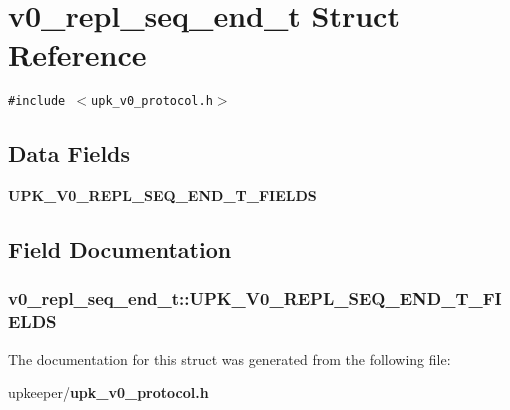 \section{v0\_\-repl\_\-seq\_\-end\_\-t Struct Reference}
\label{structv0__repl__seq__end__t}
{\tt \#include $<$upk\_\-v0\_\-protocol.h$>$}

\subsection*{Data Fields}
\begin{CompactItemize}
\item 
\bf{UPK\_\-V0\_\-REPL\_\-SEQ\_\-END\_\-T\_\-FIELDS}
\end{CompactItemize}


\subsection{Field Documentation}
\subsubsection{\setlength{\rightskip}{0pt plus 5cm}\bf{v0\_\-repl\_\-seq\_\-end\_\-t::UPK\_\-V0\_\-REPL\_\-SEQ\_\-END\_\-T\_\-FIELDS}}\label{structv0__repl__seq__end__t_9f3f4b6470f8e42439c7ef31e126ac4f}




The documentation for this struct was generated from the following file:\begin{CompactItemize}
\item 
upkeeper/\bf{upk\_\-v0\_\-protocol.h}\end{CompactItemize}
